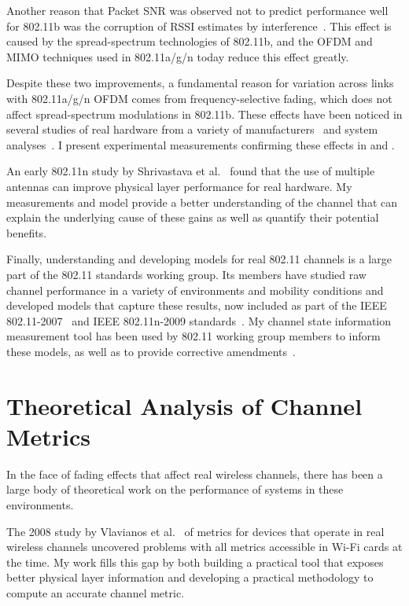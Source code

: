 Another reason that Packet SNR was observed not to predict performance well for 802.11b was the corruption of RSSI estimates by interference~\cite{Reis_interference,Vlavianos_metrics}. This effect is caused by the spread-spectrum technologies of 802.11b, and the OFDM and MIMO techniques used in 802.11a/g/n today reduce this effect greatly.

Despite these two improvements, a fundamental reason for variation across links with 802.11a/g/n OFDM comes from frequency-selective fading, which does not affect spread-spectrum modulations in 802.11b. These effects have been noticed in several studies of real hardware from a variety of manufacturers~\cite{Han_errors,Miu_MRD} and system analyses~\cite{Lampe_adaptation,Tse}. I present experimental measurements confirming these effects in  and .

An early 802.11n study by Shrivastava et al.~\cite{Shrivastava_80211n} found that the use of multiple antennas can improve physical layer performance for real hardware. My measurements and model provide a better understanding of the channel that can explain the underlying cause of these gains as well as quantify their potential benefits.

Finally, understanding and developing models for real 802.11 channels is a large part of the 802.11 standards working group. Its members have studied raw channel performance in a variety of environments and mobility conditions and developed models that capture these results, now included as part of the IEEE 802.11-2007~\cite{80211} and IEEE 802.11n-2009 standards~\cite{80211n}. My channel state information measurement tool has been used by 802.11 working group members to inform these models, as well as to provide corrective amendments~\cite{Perahia_Doppler}.

\section{Theoretical Analysis of Channel Metrics}
In the face of fading effects that affect real wireless channels, there has been a large body of theoretical work on the performance of systems in these environments.

The 2008 study by Vlavianos et al.~\cite{Vlavianos_metrics} of metrics for devices that operate in real wireless channels uncovered problems with all metrics accessible in Wi-Fi cards at the time. My work fills this gap by both building a practical tool that exposes better physical layer information and developing a practical methodology to compute an accurate channel metric.

